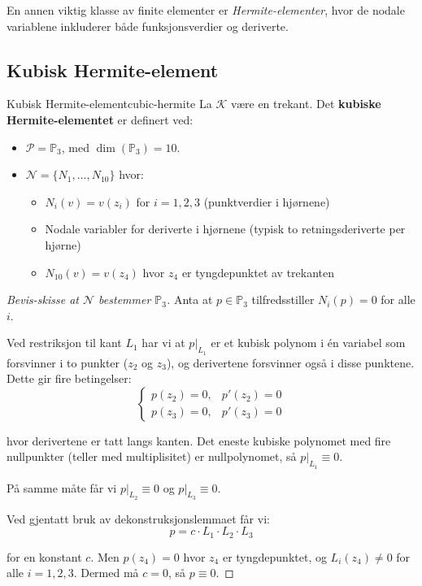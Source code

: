 \documentclass[../../main.tex]{subfiles}
\begin{document}
En annen viktig klasse av finite elementer er \emph{Hermite-elementer}, hvor de nodale variablene inkluderer både funksjonsverdier og deriverte.

\subsection{Kubisk Hermite-element}

\begin{example}{Kubisk Hermite-element}{cubic-hermite}
La $\mathcal{K}$ være en trekant. Det \textbf{kubiske Hermite-elementet} er definert ved:
\begin{itemize}
    \item $\mathcal{P} = \mathbb{P}_3$, med $\dim(\mathbb{P}_3) = 10$.
    \item $\mathcal{N} = \{N_1, \ldots, N_{10}\}$ hvor:
    \begin{itemize}
        \item $N_i(v) = v(z_i)$ for $i = 1, 2, 3$ (punktverdier i hjørnene)
        \item Nodale variabler for deriverte i hjørnene (typisk to retningsderiverte per hjørne)
        \item $N_{10}(v) = v(z_4)$ hvor $z_4$ er tyngdepunktet av trekanten
    \end{itemize}
\end{itemize}
\end{example}

\begin{center}
    
\end{center}

\begin{proof}[Bevis-skisse at $\mathcal{N}$ bestemmer $\mathbb{P}_3$]
Anta at $p \in \mathbb{P}_3$ tilfredsstiller $N_i(p) = 0$ for alle $i$.

Ved restriksjon til kant $L_1$ har vi at $p|_{L_1}$ er et kubisk polynom i én variabel som forsvinner i to punkter ($z_2$ og $z_3$), og derivertene forsvinner også i disse punktene. Dette gir fire betingelser:
\[
    \begin{cases}
        p(z_2) = 0, & p'(z_2) = 0 \\
        p(z_3) = 0, & p'(z_3) = 0
    \end{cases}
\]

hvor derivertene er tatt langs kanten. Det eneste kubiske polynomet med fire nullpunkter (teller med multiplisitet) er nullpolynomet, så $p|_{L_1} \equiv 0$.

På samme måte får vi $p|_{L_2} \equiv 0$ og $p|_{L_3} \equiv 0$.

Ved gjentatt bruk av dekonstruksjonslemmaet får vi:
\[
    p = c \cdot L_1 \cdot L_2 \cdot L_3
\]

for en konstant $c$. Men $p(z_4) = 0$ hvor $z_4$ er tyngdepunktet, og $L_i(z_4) \neq 0$ for alle $i = 1, 2, 3$. Dermed må $c = 0$, så $p \equiv 0$.
\end{proof}
\end{document}
